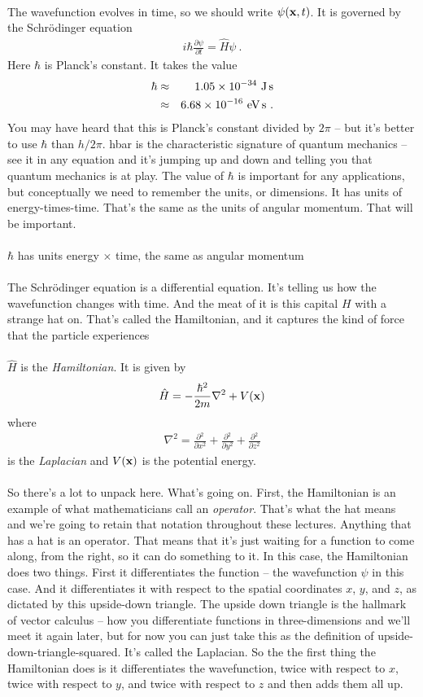 \documentclass[12pt]{article}
\def\be{\begin{eqnarray}}
\def\ee{\end{eqnarray}}
\newcommand{\nn}{\nonumber}
\newcommand\para{\paragraph{}}
\newcommand{\ppp}[2]{\frac{\partial {#1}}{\partial {#2}}}
\newcommand{\bx}{{\bf x}}
\begin{document}
\para
{\color{olive} The wavefunction evolves in time, so we should write $\psi(\bx,t)$. It is governed by the Schr\"{o}dinger equation 
\be i\hbar\ppp{\psi}{t} = \hat{H}\psi\ .\nn\ee
%
Here $\hbar$ is Planck's constant. It takes the value
%
\be \hbar&\approx& 1.05 \times 10^{-34} \ {\rm J\,s} \nn\\ &\approx& 6.68 \times 10^{-16}\ {\rm eV\,s}\ .\ee}
%
You may have heard that this is Planck's constant divided by $2\pi$ -- but it's better to use $\hbar$ than $h/2\pi$. hbar is the characteristic signature of quantum mechanics -- see it in any equation and it's jumping up and down and telling you that quantum mechanics is at play. The value of $\hbar$ is important for any applications, but conceptually we need to remember the units, or dimensions. It has units of energy-times-time. That's the same as the units of angular momentum. That will be important. 
%

\para
{\color{olive} $\hbar$ has units energy $\times$ time, the same as angular momentum}

\para
The Schr\"{o}dinger equation is a differential equation. It's telling us how the wavefunction changes with time. And the meat of it is this capital $H$ with a strange hat on. That's called the Hamiltonian, and it captures the kind of force that the particle experiences

\para
{\color{olive} $\hat{H}$ is the {\it Hamiltonian}. It is given by
%
\be \hat{H} = -\frac{\hbar^2}{2m} \nabla^2 + V(\bx)\nn\ee
%
where 
%
\be \nabla^2 = \ppp{^2}{x^2} + \ppp{^2}{y^2} + \ppp{^2}{z^2}\ee
%
is the {\it Laplacian} and $V(\bx)$ is the potential energy.}

\para
So there's a lot to unpack here. What's going on. First, the Hamiltonian is an example of what mathematicians call an {\it operator}. That's what the hat means and we're going to retain that notation throughout these lectures. Anything that has a hat is an operator. That means that it's just waiting for a function to come along, from the right, so it can do something to it. In this case, the Hamiltonian does two things. First it differentiates the function -- the wavefunction $\psi$ in this case. And it differentiates it with respect to the spatial coordinates $x$, $y$, and $z$, as dictated by this upside-down triangle. The upside down triangle is the hallmark of vector calculus -- how you differentiate functions in three-dimensions and we'll meet it again later, but for now you can just take this as the definition of upside-down-triangle-squared. It's called the Laplacian. So the the first thing the Hamiltonian does is it differentiates the wavefunction, twice with respect to $x$, twice with respect to $y$, and twice with respect to $z$ and then adds them all up. 
\end{document}
